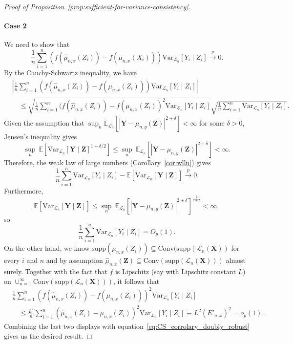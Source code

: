 \documentclass[aos]{imsart}
\theoremstyle{plain}
\theoremstyle{remark}
\newcommand{\E}{\mathbb E}								%
\newcommand{\V}{\mathrm{Var}}							%
\newcommand{\convp}{\overset p \rightarrow}             %
\newcommand{\prx}{\bm X}								%
\newcommand{\srx}{X}									%
\newcommand{\prz}{\bm Z}								%
\newcommand{\srz}{Z}									%
\newcommand{\pry}{{\bm Y}}								%
\newcommand{\sry}{Y}									%
\newcommand{\law}{\mathcal L}							%
\begin{document}
\begin{proof}[Proof of Proposition~\ref{prop:sufficient-for-variance-consistency}]
\paragraph*{Case 2}
We need to show that
$$
\frac{1}{n} \sum_{i=1}^n (f(\widehat \mu_{n,x}(Z_i))-f(\mu_{n,x}(\srx_i)))\V_{\law_n}[\sry_i\mid \srz_i] \convp 0.
$$
By the Cauchy-Schwartz inequality, we have
\begin{equation}
\begin{split} \label{eq:CS_corrolary_doubly_robust}
	&\left|\frac{1}{n} \sum_{i=1}^n (f(\widehat \mu_{n,x}(\srz_i))-f(\mu_{n,x}(\srz_i)))\V_{\law_n}[\sry_i\mid \srz_i]\right| \\ &\quad\leq \sqrt{\frac{1}{n} \sum_{i=1}^n (f(\widehat \mu_{n,x}(Z_i))-f( \mu_{n,x}(Z_i))^2\V_{\law_n}[\sry_i\mid \srz_i]}\sqrt{\frac{1}{n} \sum_{i=1}^n \V_{\law_n}[\sry_i\mid \srz_i]}.
\end{split}
\end{equation}
Given the assumption that $\sup_n \E_{\law_n}[|\pry-\mu_{n,y}(\prz)|^{2+\delta}] < \infty$ for some $\delta>0$, Jensen's inequality gives
\begin{equation*}
	\sup_n\ \E[\V_{\law_n}[\pry\mid \prz]^{1+\delta/2}] \leq \sup_n\ \E_{\law_n}[|\pry-\mu_{n,y}(\prz)|^{2+\delta}] < \infty.
\end{equation*}
Therefore, the weak law of large numbers (Corollary~\ref{cor:wlln}) gives
\begin{equation*}
\frac{1}{n} \sum_{i=1}^n \V_{\law_n}[\sry_i\mid \srz_i]- \E[\V_{\law_n}[\pry\mid \prz]]\convp 0.
\end{equation*}
Furthermore, 
\begin{equation*}
\E[\V_{\law_n}[\pry\mid \prz]] \leq \sup_n\ \E_{\law_n}[|\pry-\mu_{n,y}(\prz)|^{2+\delta}]^{\frac2{2+\delta}} < \infty,
\end{equation*}
so 
\begin{equation*}
	\frac{1}{n} \sum_{i=1}^n \V_{\law_n}[\sry_i\mid \srz_i] = O_p(1).
\end{equation*}
On the other hand, we know $\mathrm{supp}(\mu_{n,x}(Z_i))\subseteq \mathrm{Conv}(\mathrm{supp}(\law_n(\prx))$ for every $i$ and $n$ and by assumption $\widehat{\mu}_{n,x}(\prz)\subseteq\mathrm{Conv}(\mathrm{supp}(\law_n(\prx)))$ almost surely. Together with the fact that $f$ is Lipschitz (say with Lipschitz constant $L$) on $\cup_{n=1}^{\infty}\mathrm{Conv}(\mathrm{supp}(\law_n(\prx)))$, it follows that
\begin{align*}
&\frac{1}{n} \sum_{i=1}^n (f(\widehat \mu_{n,x}(Z_i))-f( \mu_{n,x}(Z_i)))^2\V_{\law_n}[\sry_i\mid \srz_i] \\
&\quad\leq 
\frac{L^2}{n} \sum_{i=1}^n (\widehat \mu_{n,x}(Z_i)- \mu_{n,x}(Z_i))^2\V_{\law_n}[\sry_i\mid \srz_i] \equiv L^2(E'_{n,x})^2 = o_p(1).
\end{align*}
Combining the last two displays with equation~\eqref{eq:CS_corrolary_doubly_robust} gives us the desired result.
\end{proof}
\end{document}
